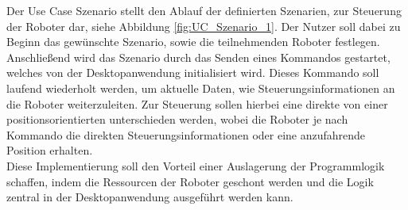 Der Use Case Szenario stellt den Ablauf der definierten Szenarien, zur Steuerung der Roboter dar, siehe Abbildung \ref{fig:UC_Szenario_1}. Der Nutzer soll dabei zu Beginn das gewünschte Szenario, sowie die teilnehmenden Roboter festlegen. Anschließend wird das Szenario durch das Senden eines Kommandos gestartet, welches von der Desktopanwendung initialisiert wird. Dieses Kommando soll laufend wiederholt werden, um aktuelle Daten, wie Steuerungsinformationen an die Roboter weiterzuleiten. Zur Steuerung sollen hierbei eine direkte von einer positionsorientierten unterschieden werden, wobei die Roboter je nach Kommando die direkten Steuerungsinformationen oder eine anzufahrende Position erhalten.\\
Diese Implementierung soll den Vorteil einer Auslagerung der Programmlogik schaffen, indem die Ressourcen der Roboter geschont werden und die Logik zentral in der Desktopanwendung ausgeführt werden kann.\\
 
